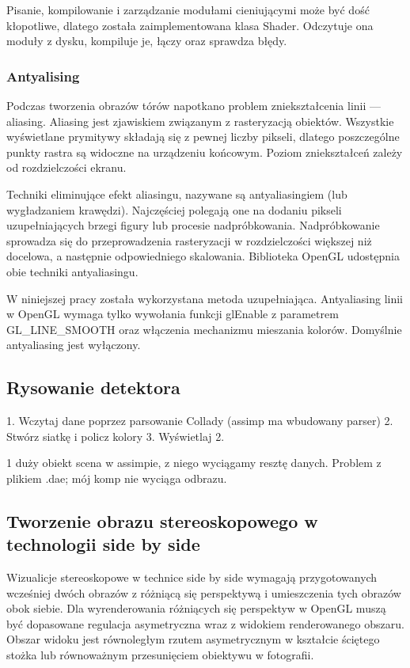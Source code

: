 Pisanie, kompilowanie i zarządzanie modułami cieniującymi może być dość kłopotliwe, dlatego została zaimplementowana klasa Shader. Odczytuje ona moduły z dysku, kompiluje je, łączy oraz sprawdza błędy. 

\subsubsection{Antyalising}
Podczas tworzenia obrazów tórów napotkano problem zniekształcenia linii --- aliasing. Aliasing jest zjawiskiem związanym z rasteryzacją obiektów. Wszystkie wyświetlane prymitywy składają się z pewnej liczby pikseli, dlatego poszczególne punkty rastra są widoczne na urządzeniu końcowym. Poziom zniekształceń zależy od rozdzielczości ekranu. 

Techniki eliminujące efekt aliasingu, nazywane są antyaliasingiem (lub wygładzaniem krawędzi). Najczęściej polegają one na dodaniu pikseli uzupełniających brzegi figury lub procesie nadpróbkowania. Nadpróbkowanie sprowadza się do przeprowadzenia rasteryzacji w rozdzielczości większej niż docelowa, a następnie odpowiedniego skalowania. Biblioteka OpenGL udostępnia obie techniki antyaliasingu. 

W niniejszej pracy została wykorzystana metoda uzupełniająca. Antyaliasing linii w OpenGL wymaga tylko wywołania funkcji glEnable z parametrem GL\_LINE\_SMOOTH oraz włączenia mechanizmu mieszania kolorów. Domyślnie antyaliasing jest wyłączony. 


\newpage
\subsection{Rysowanie detektora}
1. Wczytaj dane poprzez parsowanie Collady (assimp ma wbudowany parser)
2. Stwórz siatkę i policz kolory
3. Wyświetlaj 2.

1 duży obiekt scena w assimpie, z niego wyciągamy resztę danych. 
Problem z plikiem .dae; mój komp nie wyciąga odbrazu.


\newpage
\subsection{Tworzenie obrazu stereoskopowego w technologii side by side}
Wizualicje stereoskopowe w technice side by side wymagają przygotowanych wcześniej dwóch obrazów z różniącą się perspektywą i umieszczenia tych obrazów obok siebie. Dla wyrenderowania różniących się perspektyw w OpenGL muszą być dopasowane regulacja asymetryczna wraz z widokiem renderowanego obszaru. Obszar widoku jest równoległym rzutem asymetrycznym w kształcie ściętego stożka lub równoważnym przesunięciem obiektywu w fotografii. 

